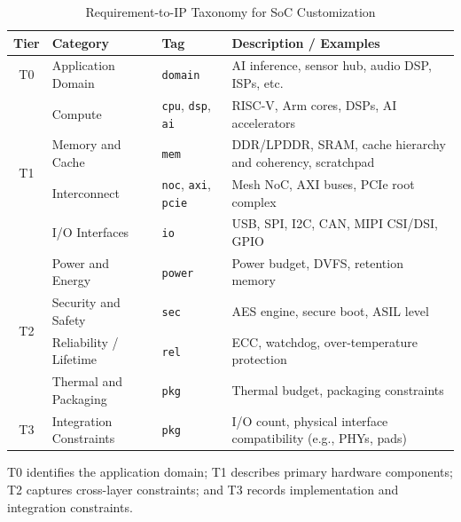 \begin{table}[htb]
\centering
\begin{threeparttable}
  \caption{Requirement-to-IP Taxonomy for SoC Customization}
  \label{tab:req_taxonomy}
  \begin{tabularx}{0.8\linewidth}{cllX}
    \toprule
    \textbf{Tier\tnote{a}} & \textbf{Category} & \textbf{Tag} & \textbf{Description / Examples} \\
    \midrule
    \multirow{1}{*}{T0} 
      & Application Domain       & \texttt{domain} & AI inference, sensor hub, audio DSP, ISPs, etc. \\
    \midrule
    \multirow{4}{*}{T1}
      & Compute                  & \texttt{cpu}, \texttt{dsp}, \texttt{ai} & RISC-V, Arm cores, DSPs, AI accelerators\\
      & Memory and Cache         & \texttt{mem}     & DDR/LPDDR, SRAM, cache hierarchy and coherency, scratchpad \\
      & Interconnect             & \texttt{noc}, \texttt{axi}, \texttt{pcie} & Mesh NoC, AXI buses, PCIe root complex \\
      & I/O Interfaces           & \texttt{io}      & USB, SPI, I2C, CAN, MIPI CSI/DSI, GPIO \\
    \midrule
    \multirow{4}{*}{T2}
      & Power and Energy         & \texttt{power}   & Power budget, DVFS, retention memory \\
      & Security and Safety      & \texttt{sec}     & AES engine, secure boot, ASIL level \\
      & Reliability / Lifetime   & \texttt{rel}     & ECC, watchdog, over-temperature protection \\
      & Thermal and Packaging    & \texttt{pkg}     & Thermal budget, packaging constraints \\
    \midrule
    \multirow{1}{*}{T3}
      & Integration Constraints  & \texttt{pkg}     & I/O count, physical interface compatibility (e.g., PHYs, pads) \\
    \bottomrule
  \end{tabularx}
  
  \begin{tablenotes}
    \footnotesize
    \item[a] T0 identifies the application domain; T1 describes primary hardware components; T2 captures cross-layer constraints; and T3 records implementation and integration constraints.
  \end{tablenotes}
  
\end{threeparttable}
\end{table}

